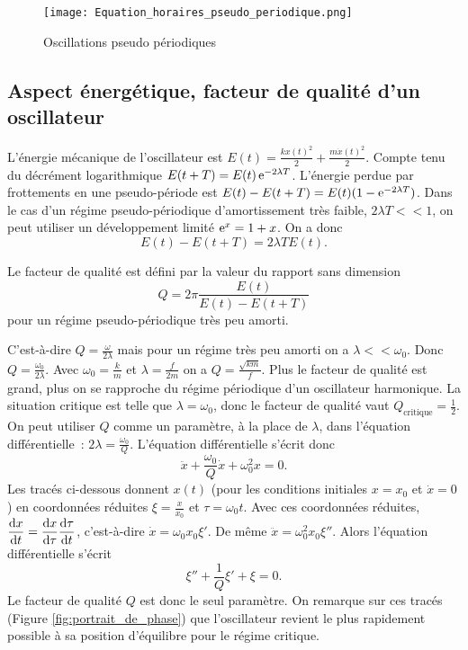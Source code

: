\begin{figure}%
  \centering
  \texttt{[image: Equation\_horaires\_pseudo\_periodique.png]}%
  \caption{Oscillations pseudo périodiques}
  \label{fig:osc_pseudo_periodiques}
\end{figure}%

\subsection{Aspect énergétique, facteur de qualité d'un oscillateur}%
\label{chap5-subsec:aspecténergétique}%
%
L'énergie mécanique de l'oscillateur est \(E(t) = \frac{k x(t)^2}{2} + \frac{m
\dot x(t)^2}{2}\). Compte tenu du décrément logarithmique \(E(t+T) = E(t)
\operatorname{e}^{-2\lambda T}\). L'énergie perdue par frottements en une pseudo-période est
\(E(t)-E(t+T) = E(t)(1-\operatorname{e}^{-2\lambda T})\). Dans le cas d'un régime
pseudo-périodique d'amortissement très faible, \(2\lambda T << 1\), on peut
utiliser un développement limité \(\operatorname{e}^x = 1+x\). On a donc
\begin{equation}%
  E(t)-E(t+T) = 2\lambda T E(t).
\end{equation}%
\begin{defdef}%
  Le facteur de qualité est défini par la valeur du rapport sans dimension
  \begin{equation}
    Q = 2\pi \frac{E(t)}{E(t)-E(t+T)}
  \end{equation}
  pour un régime pseudo-périodique très peu amorti.
\end{defdef}%
%
C'est-à-dire \(Q = \frac{\omega}{2\lambda}\) mais pour un régime très peu
amorti on a \(\lambda << \omega_0\). Donc \(Q=\frac{\omega_0}{2\lambda}\). Avec
\(\omega_0=\frac{k}{m}\) et \(\lambda =\frac{f}{2m}\) on a
\(Q=\frac{\sqrt{km}}{f}\). Plus le facteur de qualité est grand, plus on se
rapproche du régime périodique d'un oscillateur harmonique. La situation
critique est telle que \(\lambda = \omega_0\), donc le facteur de qualité vaut
\(Q_{\text{critique}} = \frac{1}{2}\). On peut utiliser \(Q\) comme un
paramètre, à la place de \(\lambda\), dans l'équation différentielle~:
\(2\lambda = \frac{\omega_0}{Q}\). L'équation différentielle s'écrit donc
\begin{equation}%
  \ddot x +\frac{\omega_0}{Q} \dot x +\omega_0^2 x = 0.
\end{equation}%
%
Les tracés ci-dessous donnent \(x(t)\) (pour les conditions initiales \(x=x_0\)
et \(\dot x=0\)) en coordonnées réduites \(\xi=\frac{x}{x_0}\) et \(\tau =
\omega_0 t\). Avec ces coordonnées réduites, \(\dfrac{\mathrm{d} x}{\mathrm{d} t} =
\dfrac{\mathrm{d} x}{\mathrm{d} \tau} \dfrac{\mathrm{d} \tau}{\mathrm{d} t}\), c'est-à-dire \(\dot x = \omega_0 x_0
\xi'\). De même \(\ddot x = \omega_0^2 x_0 \xi''\). Alors l'équation
différentielle s'écrit
\begin{equation}%
  \xi'' +\frac{1}{Q} \xi'+\xi=0.
\end{equation}%
Le facteur de qualité \(Q\) est donc le seul paramètre. On remarque sur ces
tracés (Figure \ref{fig:portrait_de_phase}) que l'oscillateur revient le plus
rapidement possible à sa position d'équilibre pour le régime critique.

